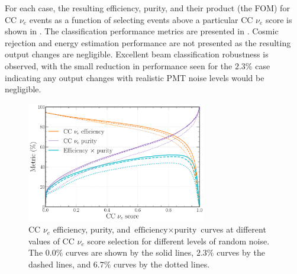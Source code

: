 For each case, the resulting efficiency, purity, and their product (the FOM) for CC $\nu_{e}$
events as a function of selecting events above a particular CC $\nu_{e}$ score is shown in
. The classification performance metrics are presented
in . Cosmic rejection and energy estimation performance are not
presented as the resulting output changes are negligible. Excellent beam classification robustness
is observed, with the small reduction in performance seen for the $2.3\%$ case indicating any
output changes with realistic PMT noise levels would be negligible.

\begin{figure} %
    \includegraphics[width=0.7\textwidth]{diagrams/7-results/calib_noise_nuel_eff_curves.pdf}
    \caption[CC $\nu_{e}$ efficiency and purity curves for different levels of random noise]
    {CC $\nu_{e}$ efficiency, purity, and $\text{efficiency}\times\text{purity}$ curves at
        different values of CC $\nu_{e}$ score selection for different levels of random noise. The
        $0.0\%$ curves are shown by the solid lines, $2.3\%$ curves by the dashed lines, and
        $6.7\%$ curves by the dotted lines.}
    \label{fig:calib_noise_nuel_eff_curves}
\end{figure}


